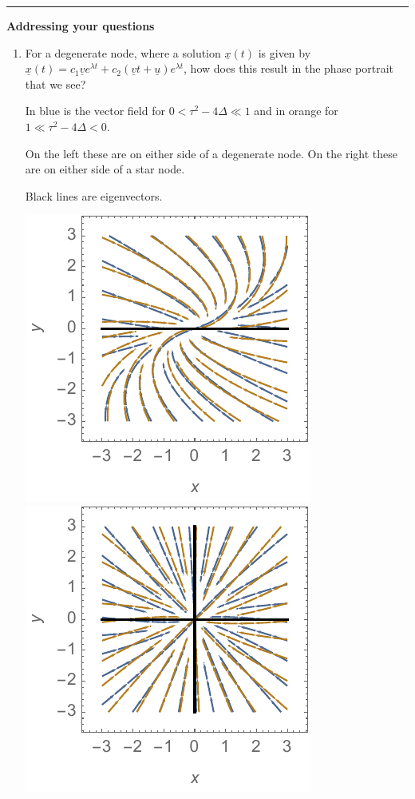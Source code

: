 \documentclass[12pt,letterpaper,noanswers]{exam}
\begin{document}
\vspace{0.2cm}
\hrule
\vspace{0.2cm}

\noindent\textbf{Addressing your questions}

\begin{enumerate}
\itemsep0em
    \item For a degenerate node, where  a solution $\underline{x}(t)$ is given by $\underline x(t) = c_1 \underline{v}e^{\lambda t} + c_2(\underline{v} t + \underline{u})e^{\lambda t}$, how does this result in the phase portrait that we see?


In blue is the vector field for $0<\tau^2-4\Delta \ll 1$ and in orange for $1 \ll \tau^2-4\Delta < 0$.  

On the left these are on either side of a degenerate node.  On the right these are on either side of a star node.

Black lines are eigenvectors.

\includegraphics[]{img/C08spiral-vs-nodep1.pdf}
\includegraphics[]{img/C08spiral-vs-nodep2.pdf}


\end{enumerate}
\end{document}

